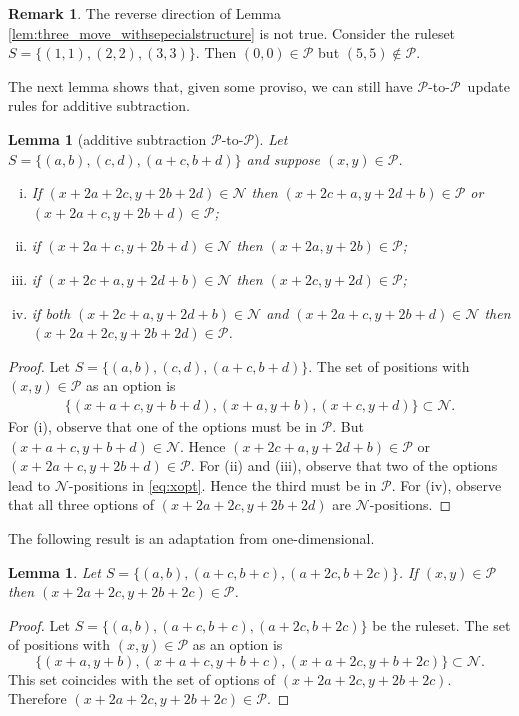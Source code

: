\documentclass{amsart}
\theoremstyle{plain}
\newtheorem{lem}[thm]{Lemma}
\theoremstyle{definition}
\newtheorem{rem}[thm]{Remark}
\newcommand{\N}{\ensuremath{\mathcal N}}
\renewcommand{\P}{\ensuremath{\mathcal P}}
\newcommand{\ur}[1]{\textcolor{red}{#1}}
\begin{document}
\begin{rem}
 The reverse direction of Lemma~ \ref{lem:three_move_withsepecialstructure} is not true. Consider the ruleset $S =\{(1,1),(2,2),(3,3)\}$. Then $(0,0) \in \P$ but  $(5,5) \notin \P$. 
\end{rem}
The next lemma shows that, given some proviso, we can still have \P-to-\P\ update rules for {\sc additive subtraction}.
\begin{lem}[{\sc additive subtraction} \P-to-\P]\label{lem:three_move_PtoP}
Let $S=\{(a,b),(c,d), (a+c,b+d)\}$ and suppose $(x,y)\in\P$. 
\begin{enumerate}[(i)]
    \item If $(x+2a+2c, y+2b+2d)\in \N$ then $(x+2c+a, y+2d+b)\in \P$ or $(x+2a+c, y+2b+d)\in \P$;
    \item if $(x+2a+c, y+2b+d)\in \N$ then $(x+2a,y+2b)\in\P$;%
    \item if $(x+2c+a, y+2d+b)\in \N$ then  $(x+2c,y+2d)\in\P$;%
    \item if both $(x+2c+a, y+2d+b)\in \N$ and $(x+2a+c, y+2b+d)\in \N$ then $(x+2a+2c, y+2b+2d)\in \P$.%
\end{enumerate}
 \end{lem}
\begin{proof}
Let $S=\{(a,b),(c,d), (a+c,b+d)\}$. 
The set of positions with $(x,y)\in \P$ as an option is 
\begin{align}\label{eq:xopt}
\{(x+a+c,y+b+d),(x+a,y+b),(x+c,y+d)\}\subset \N.
\end{align} 
For (i), observe that one of the options must be in \P. But $(x+a+c,y+b+d)\in \N$. Hence $(x+2c+a, y+2d+b)\in \P$ or $(x+2a+c, y+2b+d)\in \P$.
For (ii) and (iii), observe that two of the options lead to \N-positions in \eqref{eq:xopt}. Hence the third must be in \P. 
For (iv), observe that all three options of  $(x+2a+2c, y+2b+2d)$ are \N-positions. 
\end{proof}

The following result is an adaptation from one-dimensional.
\begin{lem}
\label{Lemma_with_twin}
Let $S=\{(a,b),(a+c,b+c), (a+2c,b+2c)\}$. If $(x, y)\in \P$ then  $(x+2a+2c, y+2b+2c)\in \P$.
\end{lem}
\begin{proof}

  Let $S=\{(a,b),(a+c,b+c), (a+2c,b+2c)\}$ be the ruleset. The set of positions with $(x,y)\in \P$ as an option is 
$$
\{(x+a,y+b), (x+a+c,y+b+c), (x+a+2c, y+b+2c)\}\subset \N.
$$
This set coincides with the set of options of $(x+2a+2c, y+2b+2c)$. %
Therefore $ (x+2a+2c, y+2b+2c)\in \P$.
\end{proof}
\end{document}
